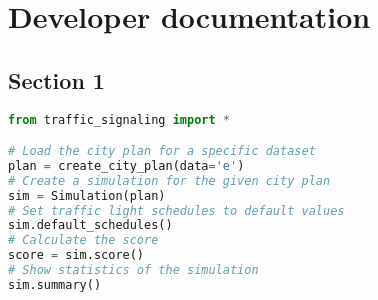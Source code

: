 \chapter{Developer documentation} \label{chap:developer_documentation}

\section{Section 1}


\begin{lstlisting}[language=Python]
from traffic_signaling import *

# Load the city plan for a specific dataset
plan = create_city_plan(data='e')
# Create a simulation for the given city plan
sim = Simulation(plan)
# Set traffic light schedules to default values
sim.default_schedules()
# Calculate the score
score = sim.score()
# Show statistics of the simulation
sim.summary()
\end{lstlisting}